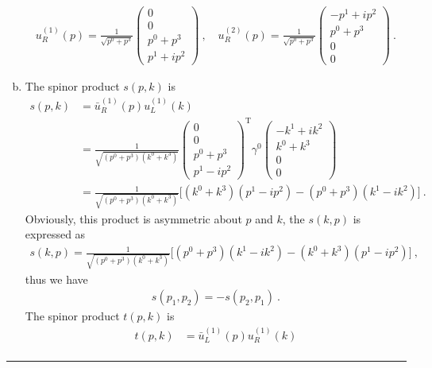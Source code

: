 \documentclass[12pt]{report}
\numberwithin{problemname}{chapter}
\newenvironment{solution}{\vspace{1em}\par\noindent{\large\textbf{\textsc{Solution}}}\par}{\vspace{1em}\hrule}
\begin{document}
\begin{solution}
\begin{enumerate}[(a)]
\begin{align}
        u^{(1)}_R(p)=\frac{1}{\sqrt{p^0+p^3}}
        \begin{pmatrix}
            0 \\
            0 \\
            p^0+p^3 \\
            p^1+ip^2
        \end{pmatrix}\ ,\quad
        u^{(2)}_R(p)=\frac{1}{\sqrt{p^0+p^3}}
        \begin{pmatrix}
            -p^1+ip^2 \\
            p^0+p^3 \\
            0 \\
            0
        \end{pmatrix}\ .
    \end{align}
    \item The spinor product $s(p,k)$ is
    \begin{align}
        s(p,k)&=\bar{u}^{(1)}_R(p)u^{(1)}_L(k) \nonumber \\
        &=\frac{1}{\sqrt{(p^0+p^3)(k^0+k^3)}}
        \begin{pmatrix}
            0 \\
            0 \\
            p^0+p^3 \\
            p^1-ip^2
        \end{pmatrix}^\text{T}
        \gamma^0
        \begin{pmatrix}
            -k^1+ik^2 \\
            k^0+k^3 \\
            0 \\
            0
        \end{pmatrix} \nonumber \\
        &=\frac{1}{\sqrt{(p^0+p^3)(k^0+k^3)}}\bigg[(k^0+k^3)(p^1-ip^2)-(p^0+p^3)(k^1-ik^2)\bigg]\ .
    \end{align}
    Obviously, this product is asymmetric about $p$ and $k$, the $s(k,p)$ is expressed as
    \begin{align}
        s(k,p)=\frac{1}{\sqrt{(p^0+p^3)(k^0+k^3)}}\bigg[(p^0+p^3)(k^1-ik^2)-(k^0+k^3)(p^1-ip^2)\bigg]\ ,
    \end{align}
    thus we have
    \begin{align}
        s(p_1,p_2)=-s(p_2,p_1)\ .
    \end{align}
    The spinor product $t(p,k)$ is
    \begin{align}
        t(p,k)&=\bar{u}^{(1)}_L(p)u^{(1)}_R(k) \nonumber \\

\end{align}
\end{enumerate}
\end{solution}
\end{document}

